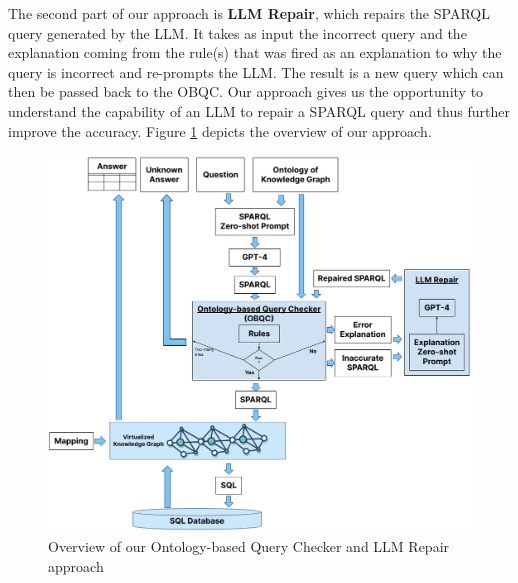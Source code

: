 \documentclass[11pt]{article}
\begin{document}
The second part of our approach is \textbf{LLM Repair}, which repairs the SPARQL query generated by the LLM. 
It takes as input the incorrect query and the explanation coming from the rule(s) that was fired as an explanation to why the query is incorrect and re-prompts the LLM. 
The result is a new query which can then be passed back to the OBQC. 
Our approach gives us the opportunity to understand the capability of an LLM to repair a SPARQL query and thus further improve the accuracy.
Figure \ref{fig:overview} depicts the overview of our approach. 

\begin{figure}[hbtp]
\centering
\includegraphics[scale=0.4]{submissions/Juan2024/images/Overview.png}
\caption{Overview of our Ontology-based Query Checker and LLM Repair approach}
\label{fig:overview}
\end{figure}

\end{document}
